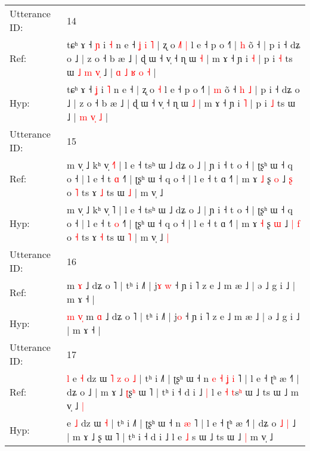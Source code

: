 \documentclass[10pt]{article}
\DeclareRobustCommand{\hl}[1]{{\textcolor{red}{#1}}}
\begin{document}
\begin{longtable}{ll}
 \\
\midrule
Utterance ID: & 14 \\
Ref: & tɕʰ ɤ ˧ \hl{ɲ} i \hl{˧} n e ˧\hl{ }\hl{ʝ}\hl{ }\hl{i}\hl{ }\hl{˥} | ʐ o\hl{ }\hl{˩}\hl{˥} \hl{|} l e ˧ p o ˧˥ | \hl{h} õ ˧\hl{}\hl{}\hl{}\hl{} | p i ˧ dʑ o ˩ | z o ˧ b æ ˩ | ɖ ɯ ˧ v̩ ˧ ɳ ɯ \hl{˧} | m ɤ ˧ ɲ i \hl{˧} | p i \hl{˧} ts ɯ\hl{ }\hl{˩}\hl{ }\hl{m}\hl{ }\hl{v}\hl{̩} ˩ |\hl{ }\hl{ɑ} \hl{˩} \hl{ʁ}\hl{ }\hl{o} \hl{˧} |
 \\
Hyp: & tɕʰ ɤ ˧ \hl{ʝ} i \hl{˥} n e ˧\hl{}\hl{}\hl{}\hl{}\hl{}\hl{} | ʐ o\hl{}\hl{}\hl{} \hl{˧} l e ˧ p o ˧˥ | \hl{m} õ ˧\hl{ }\hl{h}\hl{ }\hl{˩} | p i ˧ dʑ o ˩ | z o ˧ b æ ˩ | ɖ ɯ ˧ v̩ ˧ ɳ ɯ \hl{˩} | m ɤ ˧ ɲ i \hl{˥} | p i \hl{˩} ts ɯ\hl{}\hl{}\hl{}\hl{}\hl{}\hl{}\hl{} ˩ |\hl{}\hl{} \hl{m} \hl{}\hl{v}\hl{̩} \hl{˩} |
 \\
\midrule
Utterance ID: & 15 \\
Ref: & m v̩ ˩ kʰ v̩ \hl{˧}˥ | l e ˧ tsʰ ɯ ˩ dʑ o ˩ | ɲ i ˧ t o ˧ | ʈʂʰ ɯ ˧ q o ˧ | l e ˧ t \hl{ɑ} ˧˥ | ʈʂʰ ɯ ˧ q o ˧ | l e ˧ t ɑ ˧˥ | m ɤ \hl{˩} ʂ \hl{o} ˩\hl{}\hl{} \hl{ʂ} o \hl{˥} ts ɤ \hl{˩} ts ɯ \hl{˩} | m v̩ ˩\hl{}\hl{}
 \\
Hyp: & m v̩ ˩ kʰ v̩ \hl{}˥ | l e ˧ tsʰ ɯ ˩ dʑ o ˩ | ɲ i ˧ t o ˧ | ʈʂʰ ɯ ˧ q o ˧ | l e ˧ t \hl{o} ˧˥ | ʈʂʰ ɯ ˧ q o ˧ | l e ˧ t ɑ ˧˥ | m ɤ \hl{˧} ʂ \hl{ɯ} ˩\hl{ }\hl{|} \hl{f} o \hl{˧} ts ɤ \hl{˧} ts ɯ \hl{˥} | m v̩ ˩\hl{ }\hl{|}
 \\
\midrule
Utterance ID: & 16 \\
Ref: & \hl{}\hl{}\hl{}\hl{}\hl{}m \hl{ɤ} ˩ dʑ o ˥ | tʰ i ˩˥ | j\hl{ɤ}\hl{ }\hl{w} ˧ ɲ i ˥ z e ˩ m æ ˩ | ə ˩ g i ˩ | m ɤ ˧ |
 \\
Hyp: & \hl{m}\hl{ }\hl{v}\hl{̩}\hl{ }m \hl{ɑ} ˩ dʑ o ˥ | tʰ i ˩˥ | j\hl{}\hl{}\hl{o} ˧ ɲ i ˥ z e ˩ m æ ˩ | ə ˩ g i ˩ | m ɤ ˧ |
 \\
\midrule
Utterance ID: & 17 \\
Ref: & \hl{l}\hl{ }e \hl{˧} dz ɯ\hl{ }\hl{˥}\hl{ }\hl{z}\hl{ }\hl{o} \hl{˩} | tʰ i ˩˥ | ʈʂʰ ɯ ˧ n\hl{ }\hl{e}\hl{ }\hl{˧}\hl{ }\hl{ʝ} \hl{i} ˥ | l e ˧ ʈʰ æ ˧˥ | dʑ o\hl{}\hl{}\hl{}\hl{} ˩ | m ɤ ˩ \hl{ʈ}ʂ\hl{ʰ} ɯ ˥ | tʰ i ˧ d i ˩\hl{ }\hl{|} l e \hl{˧} \hl{t}s\hl{ʰ} ɯ ˩ ts ɯ ˩\hl{}\hl{} m v̩ ˩\hl{ }\hl{|}
 \\
Hyp: & \hl{}\hl{}e \hl{˩} dz ɯ\hl{}\hl{}\hl{}\hl{}\hl{}\hl{} \hl{˧} | tʰ i ˩˥ | ʈʂʰ ɯ ˧ n\hl{}\hl{}\hl{}\hl{}\hl{}\hl{} \hl{æ} ˥ | l e ˧ ʈʰ æ ˧˥ | dʑ o\hl{ }\hl{˩}\hl{ }\hl{|} ˩ | m ɤ ˩ \hl{}ʂ\hl{} ɯ ˥ | tʰ i ˧ d i ˩\hl{}\hl{} l e \hl{˩} \hl{}s\hl{} ɯ ˩ ts ɯ ˩\hl{ }\hl{|} m v̩ ˩\hl{}\hl{}
 \\

\end{longtable}
\end{document}
